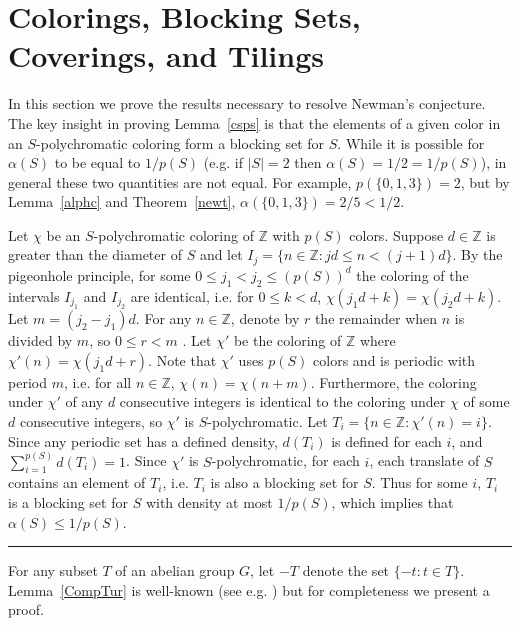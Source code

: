 \documentclass[12pt]{article}
\newenvironment{proofof}[1]{{\bf Proof of #1:  }}{\hfill\rule{2mm}{2mm}}
\newcommand{\Z}{\ensuremath{\mathbb Z}}
\begin{document}
\section{Colorings, Blocking Sets, Coverings, and Tilings}\label{polcov}

In this section we prove the results necessary to resolve Newman's conjecture. The key insight in proving Lemma~\ref{csps} is that the elements of a given color in an $S$-polychromatic coloring form a blocking set for $S$. While it is possible for $\alpha(S)$ to be equal to $1/p(S)$ (e.g. if $|S|=2$ then $\alpha(S)= 1/2 = 1/p(S)$), in general these two quantities are not equal.  For example, $p(\{0,1,3\}) = 2$, but by Lemma~\ref{alphc} and Theorem~\ref{newt}, $\alpha(\{0,1,3\}) = 2/5 < 1/2$.



\begin{proofof}{Lemma~\ref{csps}}
Let $\chi$ be an $S$-polychromatic coloring of $\Z$ with $p(S)$ colors.  Suppose $d \in \Z$ is greater than the diameter of $S$ and let $I_j = \{n\in \Z : jd \le n < (j+1)d\}$.  By the pigeonhole principle, for some $0 \le j_1 < j_2 \le (p(S))^d$ the coloring of the intervals $I_{j_1}$ and $I_{j_2}$ are identical, i.e. for $0\le k <d$, $\chi(j_1d+k) = \chi(j_2d+k)$.  Let $m = (j_2-j_1)d$. For any $n\in \Z$, denote by $r$ the remainder when $n$ is divided by $m$, so $0\le r < m$ . Let $\chi'$ be the coloring of $\Z$ where $\chi'(n) = \chi(j_1d+r)$.  Note that $\chi'$  uses $p(S)$ colors and is periodic with period $m$, i.e. for all $n \in \Z$, $\chi(n) = \chi(n +m)$. Furthermore, the coloring under $\chi'$ of any $d$ consecutive integers is identical to the coloring under $\chi$ of some $d$ consecutive integers, so $\chi'$ is $S$-polychromatic. Let $T_i = \{n\in \Z: \chi'(n) = i\}$. Since any periodic set has a defined density, $d(T_i)$ is defined for each $i$, and $\sum_{i=1}^{p(S)} d(T_i) = 1$.  Since $\chi'$ is $S$-polychromatic, for each $i$, each translate of $S$ contains an element of $T_i$, i.e. $T_i$ is also a blocking set for $S$. Thus for some $i$, $T_i$ is a blocking set for $S$ with density at most $1/p(S)$, which implies that $\alpha(S) \le 1/p(S)$. 
\end{proofof}







For any subset $T$ of an abelian group $G$, let $-T$ denote the set $\{-t: t\in T\}$. Lemma~\ref{CompTur} is well-known (see e.g. \cite{St86}) but for completeness we present a proof.
\end{document}
